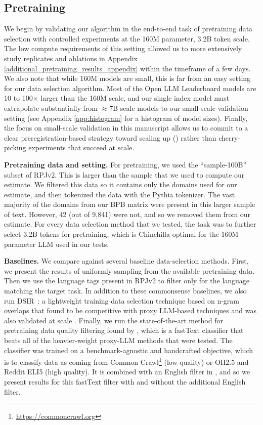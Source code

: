 \documentclass{article} %
\begin{document}
\subsection{Pretraining}

We begin by validating our algorithm in the end-to-end task of pretraining data selection with controlled experiments at the 160M parameter, 3.2B token scale. The 
low compute requirements of this setting allowed us to more extensively study replicates and ablations in Appendix \ref{additional_pretraining_results_appendix} within the timeframe of a few days. We also note that while 160M models are small, this is far from an easy setting for our data selection algorithm. Most of the Open LLM Leaderboard models are 10 to 100$\times$ larger than the 160M scale, and our single index model must extrapolate substantially from $\approx$7B scale models to our small-scale validation setting (see Appendix \ref{app:histogram} for a histogram of model sizes). Finally, the focus on small-scale validation in this manuscript allows us to commit to a clear preregistration-based strategy toward scaling up () rather than cherry-picking experiments that succeed at scale.

\textbf{Pretraining data and setting.}
For pretraining, we used the ``sample-100B'' subset of RPJv2. This is larger than the sample that we used to compute our estimate. We filtered this data so it contains only the domains used for our estimate, and then tokenized the data with the Pythia tokenizer. The vast majority of the domains from our BPB matrix were present in this larger sample of text. However, 42 (out of 9,841) were not, and so we removed them from our estimate. For every data selection method that we tested, the task was to further select 3.2B tokens for pretraining, which is Chinchilla-optimal \citep{chinchilla} for the 160M-parameter LLM used in our tests.

\textbf{Baselines.} We compare against several baseline data-selection methods. First, we present the results of uniformly sampling from the available pretraining data. Then we use the language tags present in RPJv2 to filter only for the language matching the target task. In addition to these commonsense baselines, we also run DSIR~\citep{dsir}: a lightweight training data selection technique based on n-gram overlaps that \citet{datacomp} found to be competitive with proxy LLM-based techniques and was also validated at scale \citep{parmar2024datadataeverywhereguide}. Finally, we run the state-of-the-art method for pretraining data quality filtering found by \citeauthor{datacomp}, which is a fastText classifier that beats all of the heavier-weight proxy-LLM methods that were tested. The classifier was trained on a benchmark-agnostic and handcrafted objective, which is to classify data as coming from Common Crawl\footnote{\url{https://commoncrawl.org}} (low quality) or OH2.5 \citep{oh2.5} and Reddit ELI5 \citep{eli5} (high quality). It is combined with an English filter in \citeauthor{datacomp}, and so we present results for this fastText filter with and without the additional English filter.
\end{document}
